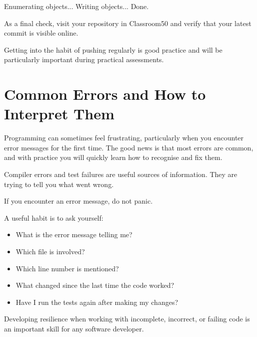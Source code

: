 \documentclass{csc2059practical}
\begin{document}
\begin{terminal}
Enumerating objects...
Writing objects...
Done.
\end{terminal}

As a final check, visit your repository in Classroom50 and verify that your latest commit is visible online.

\begin{importantnote}
Getting into the habit of pushing regularly is good practice and will be particularly important during practical assessments.
\end{importantnote}

\section{Common Errors and How to Interpret Them}

Programming can sometimes feel frustrating, particularly when you encounter error messages for the first time. The good news is that most errors are common, and with practice you will quickly learn how to recognise and fix them.

Compiler errors and test failures are useful sources of information. They are trying to tell you what went wrong.

\begin{reflectionbox}
If you encounter an error message, do not panic.

A useful habit is to ask yourself:

\begin{itemize}
  \item What is the error message telling me?
  \item Which file is involved?
  \item Which line number is mentioned?
  \item What changed since the last time the code worked?
  \item Have I run the tests again after making my changes?
\end{itemize}

Developing resilience when working with incomplete, incorrect, or failing code is an important skill for any software developer.
\end{reflectionbox}
\end{document}
